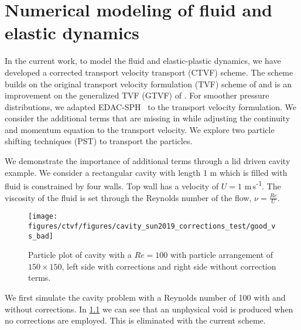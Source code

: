 \chapter{Numerical modeling of fluid and elastic dynamics}
\label{chap:ctvf}

In the current work, to model the fluid and elastic-plastic dynamics, we have
developed a corrected transport velocity transport (CTVF) scheme. The scheme
builds on the original transport velocity formulation (TVF) scheme of
\textcite{Adami2013} and is an improvement on the generalized TVF (GTVF) of
\textcite{zhang2017generalized}. For smoother pressure distributions, we adapted
EDAC-SPH~\parencite{edac-sph:cf:2019} to the transport velocity formulation. We
consider the additional terms that are missing in \parencite{Adami2013} while
adjusting the continuity and momentum equation to the transport velocity. We
explore two particle shifting techniques (PST) to transport the particles.

We demonstrate the importance of additional terms through a lid driven cavity
example. We consider a rectangular cavity with length 1 m which is filled with
fluid is constrained by four walls. Top wall has a velocity of $U = 1 $
m\,s\textsuperscript{-1}. The viscosity of the fluid is set through the Reynolds
number of the flow, $\nu = \frac{Re}{U}$.
%
\begin{figure}
  \centering
  \texttt{[image: figures/ctvf/figures/cavity\_sun2019\_corrections\_test/good\_vs\_bad]}
  \caption{ Particle plot of cavity with a $Re=100$ with particle arrangement
    of $150 \times 150$, left side with corrections and right side without
    correction terms.}%
  \label{fig:ldc:particle_plots_re100_compare}
\end{figure}
%
We first simulate the cavity problem with a Reynolds number of 100 with and
without corrections. In \cref{fig:ldc:particle_plots_re100_compare} we can see
that an unphysical void is produced when no corrections are employed. This is
eliminated with the current scheme.


